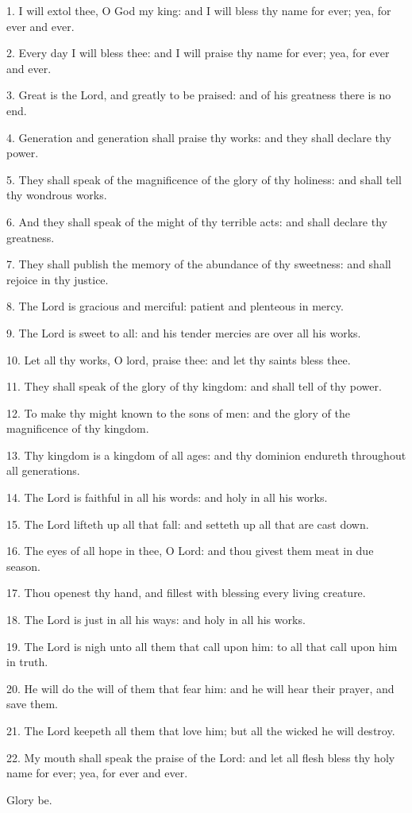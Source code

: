  1. I will extol thee, O God my king: and I will bless thy name for ever; yea, for ever and ever.
 	
 2. Every day I will bless thee: and I will praise thy name for ever; yea, for ever and ever.
 	
 3. Great is the Lord, and greatly to be praised: and of his greatness there is no end.
 	
 4. Generation and generation shall praise thy works: and they shall declare thy power.
 	
 5. They shall speak of the magnificence of the glory of thy holiness: and shall tell thy wondrous works.

6. And they shall speak of the might of thy terrible acts: and shall declare thy greatness.

7. They shall publish the memory of the abundance of thy sweetness: and shall rejoice in thy justice.

8. The Lord is gracious and merciful: patient and plenteous in mercy.

9. The Lord is sweet to all: and his tender mercies are over all his works.

10. Let all thy works, O lord, praise thee: and let thy saints bless thee.

11. They shall speak of the glory of thy kingdom: and shall tell of thy power.

12. To make thy might known to the sons of men: and the glory of the magnificence of thy kingdom.

13. Thy kingdom is a kingdom of all ages: and thy dominion endureth throughout all generations.

14. The Lord is faithful in all his words: and holy in all his works.

15. The Lord lifteth up all that fall: and setteth up all that are cast down.

16. The eyes of all hope in thee, O Lord: and thou givest them meat in due season.

17. Thou openest thy hand, and fillest with blessing every living creature.

18. The Lord is just in all his ways: and holy in all his works.

19. The Lord is nigh unto all them that call upon him: to all that call upon him in truth.

20. He will do the will of them that fear him: and he will hear their prayer, and save them.

21. The Lord keepeth all them that love him; but all the wicked he will destroy.

22. My mouth shall speak the praise of the Lord: and let all flesh bless thy holy name for ever; yea, for ever and ever. 

Glory be.